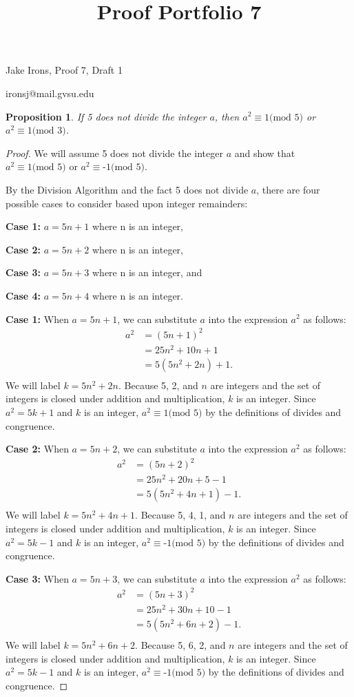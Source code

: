 \documentclass[11 pt]{article}
\title{Proof Portfolio 7}
\newtheorem{proposition}{Proposition}
\newcommand{\newpar}{\vspace{.15in}\noindent}
\begin{document}
\noindent Jake Irons, Proof 7, Draft 1

\noindent ironsj@mail.gvsu.edu
\newpar
\begin{proposition}
If 5 does not divide the integer $a$, then $a^2\equiv \mbox{1(mod 5)}$ or $a^2\equiv \mbox{1(mod 3)}$.
\end{proposition}
\begin{proof}
We will assume 5 does not divide the integer $a$ and show that $a^2\equiv \mbox{1(mod 5)}$ or $a^2\equiv \mbox{-1(mod 5)}$.

\newpar By the Division Algorithm and the fact 5 does not divide $a$, there are four possible cases to consider based upon integer remainders:

\textbf{Case 1:} $a=5n+1$ where n is an integer, 

\textbf{Case 2:} $a=5n+2$ where n is an integer,

\textbf{Case 3:} $a=5n+3$ where n is an integer, and

\textbf{Case 4:} $a=5n+4$ where n is an integer.

\newpar
\textbf{Case 1:} When $a=5n+1$, we can substitute $a$ into the expression $a^2$ as follows:
\begin{align*}
a^2&=(5n+1)^2 \\
&= 25n^2+10n+1 \\
&= 5(5n^2+2n)+1. \\
\end{align*}
\noindent
We will label $k=5n^2+2n$. Because 5, 2, and $n$ are integers and the set of integers is closed under addition and multiplication, $k$ is an integer. Since $a^2=5k+1$ and $k$ is an integer, $a^2\equiv \mbox{1(mod 5)}$ by the definitions of divides and congruence. 


\newpar
\textbf{Case 2:} When $a=5n+2$, we can substitute $a$ into the expression $a^2$ as follows:
\begin{align*}
a^2&=(5n+2)^2 \\
&= 25n^2+20n+5-1 \\
&= 5(5n^2+4n+1)-1. \\
\end{align*}
\noindent
We will label $k=5n^2+4n+1$. Because 5, 4, 1, and $n$ are integers and the set of integers is closed under addition and multiplication, $k$ is an integer. Since $a^2=5k-1$ and $k$ is an integer, $a^2\equiv \mbox{-1(mod 5)}$ by the definitions of divides and congruence. 


\newpar
\textbf{Case 3:} When $a=5n+3$, we can substitute $a$ into the expression $a^2$ as follows:
\begin{align*}
a^2&=(5n+3)^2 \\
&= 25n^2+30n+10-1 \\
&= 5(5n^2+6n+2)-1. \\
\end{align*}
\noindent
We will label $k=5n^2+6n+2$. Because 5, 6, 2, and $n$ are integers and the set of integers is closed under addition and multiplication, $k$ is an integer. Since $a^2=5k-1$ and $k$ is an integer, $a^2\equiv \mbox{-1(mod 5)}$ by the definitions of divides and congruence. 



\end{proof}
\end{document}
